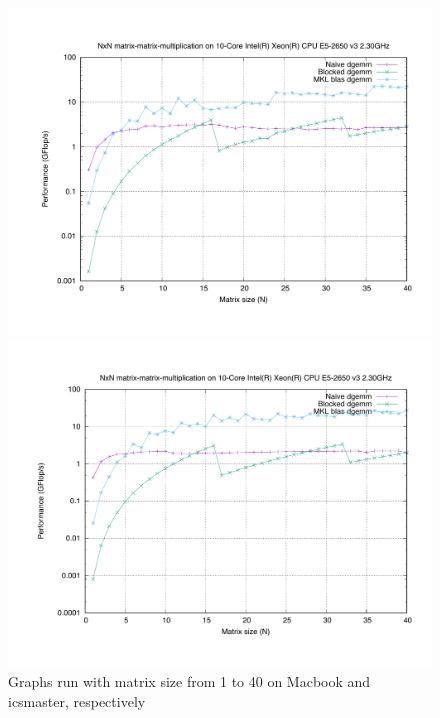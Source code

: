 \documentclass[unicode,11pt,a4paper,oneside,numbers=endperiod,openany]{scrartcl}
\begin{document}
\begin{enumerate}
            \begin{figure}[H]
                \begin{minipage}{.5\textwidth}
                    \centering
                    \includegraphics[width=\linewidth]{0to40_mac}
                \end{minipage}%
                \hfill
                \begin{minipage}{.5\textwidth}
                    \centering
                    \includegraphics[width=\linewidth]{0to40_icsmaster}
                \end{minipage}
                \caption{Graphs run with matrix size from 1 to 40 on Macbook and icsmaster, respectively}
                \label{c512}
            \end{figure}


\end{enumerate}
\end{document}
